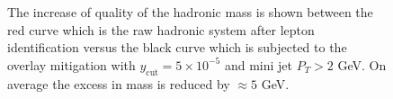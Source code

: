    \begin{figure}
        \centering
       
        \caption{The increase of quality of the hadronic mass is shown between the red curve which is the raw hadronic system after lepton identification versus the black curve which is subjected to the overlay mitigation with $y_{\text{cut}} = 5\times10^{-5}$ and mini jet $P_T > 2$ GeV. On average the excess in mass is reduced by $\approx 5$ GeV. }
        \label{fig:supmass}
\end{figure}


